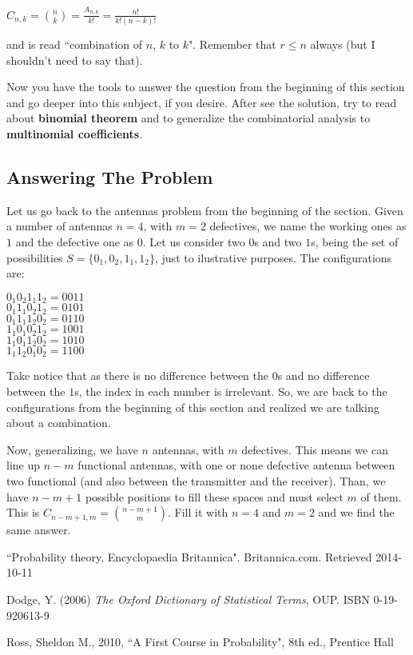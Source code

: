 \documentclass[a4paper,twocolumn]{article}
\begin{document}
\begin{center}
$C_{n,k} = \binom{n}{k} = \frac{A_{n,k}}{k!} = \frac{n!}{k!(n - k)!}$
\end{center}

\noindent and is read ``combination of $n$, $k$ to $k$". Remember that $r \leq n$ always (but I shouldn't need to say that).

Now you have the tools to answer the question from the beginning of this section and go deeper into this subject, if you desire. After see the solution, try to read about \textbf{binomial theorem} and to generalize the combinatorial analysis to \textbf{multinomial coefficients}.


\subsection{Answering The Problem}

Let us go back to the antennas problem from the beginning of the section. Given a number of antennas $n = 4$, with $m = 2$ defectives, we name the working ones as $1$ and the defective one as $0$. Let us consider two $0$s and two $1$s, being the set of possibilities $S = \{0_1, 0_2, 1_1, 1_2\}$, just to ilustrative purposes. The configurations are:

\begin{center}
$0_1 0_2 1_1 1_2 = 0 0 1 1$\\
$0_1 1_1 0_2 1_2 = 0 1 0 1$\\
$0_1 1_1 1_2 0_2 = 0 1 1 0$\\
$1_1 0_1 0_2 1_2 = 1 0 0 1$\\
$1_1 0_1 1_2 0_2 = 1 0 1 0$\\
$1_1 1_2 0_1 0_2 = 1 1 0 0$\\
\end{center}

\noindent Take notice that as there is no difference between the $0$s and no difference between the $1$s, the index in each number is irrelevant. So, we are back to the configurations from the beginning of this section and realized we are talking about a combination.

Now, generalizing, we have $n$ antennas, with $m$ defectives. This means we can line up $n - m$ functional antennas, with one or none defective antenna between two functional (and also between the transmitter and the receiver). Than, we have $n - m + 1$ possible positions to fill these spaces and must select $m$ of them. This is $C_{n - m + 1,m} = \binom{n - m + 1}{m}$. Fill it with $n = 4$ and $m = 2$ and we find the same answer.


\begin{thebibliography}{9}
         ``Probability theory, Encyclopaedia Britannica".
         Britannica.com.
         Retrieved 2014-10-11

        Dodge, Y. (2006)
        \textit{The Oxford Dictionary of Statistical Terms}, OUP.
        ISBN 0-19-920613-9

        Ross, Sheldon M.,
        2010,
        ``A First Course in Probability", 8th ed.,
        Prentice Hall
\end{thebibliography}
\end{document}
